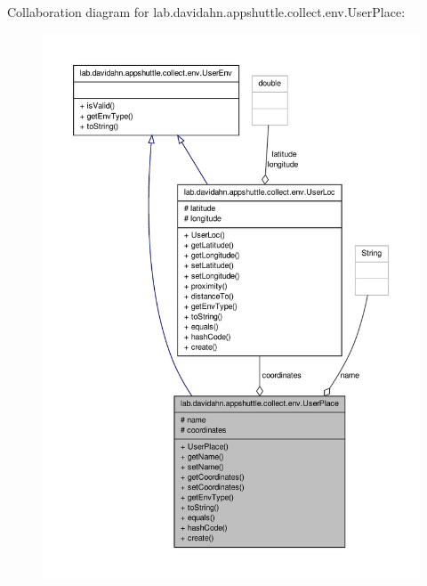 \-Collaboration diagram for lab.\-davidahn.\-appshuttle.\-collect.\-env.\-User\-Place\-:
\nopagebreak
\begin{figure}[H]
\begin{center}
\leavevmode
\includegraphics[width=350pt]{classlab_1_1davidahn_1_1appshuttle_1_1collect_1_1env_1_1_user_place__coll__graph}
\end{center}
\end{figure}

